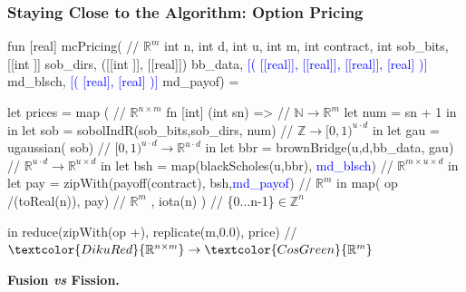 \documentclass{beamer}
\newcommand{\blue}[1]{\textcolor{Blue}{{#1}}}
\newcommand{\emp}[1]{\textcolor{DikuRed}{ #1}}
\newcommand{\emphh}[1]{\textcolor{CosGreen}{ #1}}
\newcommand{\mymath}[1]{$ #1 $}
\newcommand{\myindu}[1]{^{#1}}
\newcommand{\mymathbb}[1]{\mathbb{#1}}
\begin{document}
\begin{frame}[fragile,t]
  \frametitle{Staying Close to the Algorithm: Option Pricing}

\begin{colorcode}
fun \emphh{[real]} mcPricing( //\emphh{\mymath{\mymathbb{R}\myindu{m}}} 
        int n, int d, int u, int m, int contract, int sob_bits, 
        [[int ]] sob_dirs,   ([[int ]], [[real]])     bb_data, 
        \blue{[( [[real]], [[real]], [[real]], [real] )]}    md_blsch,
        \blue{[( [real], [real] )]}                          md_payof) =

  let \emp{prices} = \emphh{map} (                                          //\emp{\mymath{\mymathbb{R}\myindu{n\times{}m}}}
      \emp{fn [int] (int sn)} =>                                    //\emp{\mymath{\mymathbb{N}\rightarrow\mymathbb{R}\myindu{m}}}
            let num = sn + 1 in
         in let \emp{sob} = sobolIndR(sob_bits,sob_dirs,\emp{num})        //\emp{\mymath{\mymathbb{Z}\rightarrow[0,1)\myindu{u\cdot{}d}}}
         in let \emp{gau} = ugaussian(\emp{sob})                          //\emp{\mymath{[0,1)\myindu{u\cdot{}d} \rightarrow \mymathbb{R}\myindu{u\cdot{}d}}}
         in let \emp{bbr} = brownBridge(u,d,bb_data,\emp{gau})            //\emp{\mymath{\mymathbb{R}\myindu{u\cdot{}d}\rightarrow\mymathbb{R}\myindu{u\times{}d}}}
         in let \emp{bsh} = \emphh{map}(blackScholes(u,bbr), \blue{md_blsch})      //\emp{\mymath{\mymathbb{R}\myindu{m\times{}u\times{}d}}}
         in let \emp{pay} = \emphh{zipWith}(payoff(contract), bsh,\blue{md_payof}) //\emp{\mymath{\mymathbb{R}\myindu{m}}}
            in        \emphh{map}( op /(toReal(n)), pay)              //\emp{\mymath{\mymathbb{R}\myindu{m}}}  
    , \emp{iota(n)} ) //\emp{\{0\mymath{\ldots}n-1\}\mymath{\in\mymathbb{Z}\myindu{n}}} 

  in \emphh{reduce}(zipWith(op +), replicate(m,0.0), \emp{price})           //\mymath{\emp{\mymathbb{R}\myindu{n\times{}m}}\rightarrow\emphh{\mymathbb{R}\myindu{m}}}
\end{colorcode}
\bigskip 

\emphh{\bf Fusion {\em vs} Fission.}

\end{frame}
\end{document}

